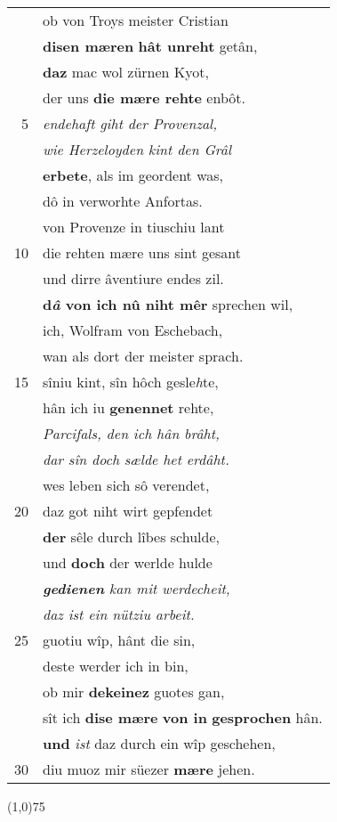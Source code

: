 \documentclass[8pt,a4paper,notitlepage]{article}
\begin{document}
\begin{table}[ht]
\begin{minipage}[t]{0.5\linewidth}
\begin{tabular}{rl}
 & ob von Troys meister Cristian\\ 
 & \textbf{disen mæren} \textbf{hât unreht} getân,\\ 
 & \textbf{daz} mac wol zürnen Kyot,\\ 
 & der uns \textbf{die mære rehte} enbôt.\\ 
5 & \textit{endehaft giht der Provenzal, }\\ 
 & \textit{wie Herzeloyden kint den Grâl}\\ 
 & \textbf{erbete}, als im geordent was,\\ 
 & dô in verworhte Anfortas.\\ 
 & von Provenze in tiuschiu lant\\ 
10 & die rehten mære uns sint gesant\\ 
 & und dirre âventiure endes zil.\\ 
 & \textbf{d\textit{â} von ich nû niht mêr} sprechen wil,\\ 
 & ich, Wolfram von Eschebach,\\ 
 & wan als dort der meister sprach.\\ 
15 & sîniu kint, sîn hôch gesle\textit{h}te,\\ 
 & hân ich iu \textbf{genennet} rehte,\\ 
 & \textit{Parcifals, den ich hân brâht,}\\ 
 & \textit{dar sîn doch sælde het erdâht.}\\ 
 & wes leben sich sô verendet,\\ 
20 & daz got niht wirt gepfendet\\ 
 & \textbf{der} sêle durch lîbes schulde,\\ 
 & und \textbf{doch} der werlde hulde\\ 
 & \textit{\textbf{gedienen} kan mit werdecheit,}\\ 
 & \textit{daz ist ein nütziu arbeit.}\\ 
25 & guotiu wîp, hânt die sin,\\ 
 & deste werder ich in bin,\\ 
 & ob mir \textbf{dekeinez} guotes gan,\\ 
 & sît ich \textbf{dise mære} \textbf{von in} \textbf{gesprochen} hân.\\ 
 & \textbf{und} \textit{ist} daz durch ein wîp geschehen,\\ 
30 & diu muoz mir süezer \textbf{mære} jehen.\\ 
\end{tabular}
\scriptsize
\line(1,0){75} \newline

\end{minipage}
\end{table}
\end{document}
